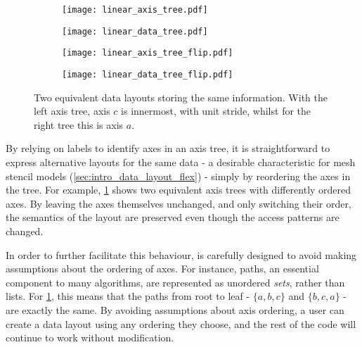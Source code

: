 \documentclass[thesis]{subfiles}
\begin{document}
\begin{figure}
  \centering
  \begin{subfigure}{.42\textwidth}
    \centering
    \begin{minipage}{.35\textwidth}
      \begin{center}
        \texttt{[image: linear\_axis\_tree.pdf]}
      \end{center}
    \end{minipage}
    \begin{minipage}{.6\textwidth}
      \begin{center}
        \texttt{[image: linear\_data\_tree.pdf]}
      \end{center}
    \end{minipage}
  \end{subfigure}
  \hspace{2em}
  \begin{subfigure}{.42\textwidth}
    \centering
    \begin{minipage}{.35\textwidth}
      \begin{center}
        \texttt{[image: linear\_axis\_tree\_flip.pdf]}
      \end{center}
    \end{minipage}
    \begin{minipage}{.6\textwidth}
      \begin{center}
        \texttt{[image: linear\_data\_tree\_flip.pdf]}
      \end{center}
    \end{minipage}
  \end{subfigure}

  \caption{
    Two equivalent data layouts storing the same information.
    With the left axis tree, axis $c$ is innermost, with unit stride, whilst for the right tree this is axis $a$.
  }
  \label{fig:linear_axis_tree_flip}
\end{figure}

By relying on labels to identify axes in an axis tree, it is straightforward to express alternative layouts for the same data - a desirable characteristic for mesh stencil models (\cref{sec:intro_data_layout_flex}) - simply by reordering the axes in the tree.
For example, \cref{fig:linear_axis_tree_flip} shows two equivalent axis trees with differently ordered axes.
By leaving the axes themselves unchanged, and only switching their order, the semantics of the layout are preserved even though the access patterns are changed.

In order to further facilitate this behaviour,  is carefully designed to avoid making assumptions about the ordering of axes.
For instance, paths, an essential component to many algorithms, are represented as unordered \emph{sets}, rather than lists.
For \cref{fig:linear_axis_tree_flip}, this means that the paths from root to leaf - $\{ a, b, c \}$ and $\{ b, c, a \}$ - are exactly the same.
By avoiding assumptions about axis ordering, a user can create a data layout using any ordering they choose, and the rest of the code will continue to work without modification.
\end{document}
